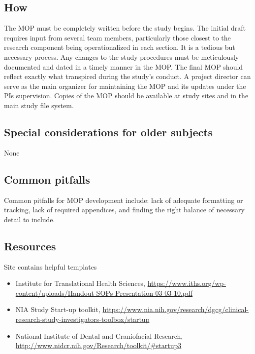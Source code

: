 \documentclass[]{book}
\providecommand{\tightlist}{%
  \setlength{\itemsep}{0pt}\setlength{\parskip}{0pt}}
\theoremstyle{definition}
\theoremstyle{definition}
\theoremstyle{definition}
\theoremstyle{remark}
\begin{document}
\subsection{How}\label{how-12}

The MOP must be completely written before the study begins. The initial
draft requires input from several team members, particularly those
closest to the research component being operationalized in each section.
It is a tedious but necessary process. Any changes to the study
procedures must be meticulously documented and dated in a timely manner
in the MOP. The final MOP should reflect exactly what transpired during
the study's conduct. A project director can serve as the main organizer
for maintaining the MOP and its updates under the PIs supervision.
Copies of the MOP should be available at study sites and in the main
study file system.

\subsection{Special considerations for older
subjects}\label{special-considerations-for-older-subjects-8}

None

\subsection{Common pitfalls}\label{common-pitfalls-11}

Common pitfalls for MOP development include: lack of adequate formatting
or tracking, lack of required appendices, and finding the right balance
of necessary detail to include.

\subsection{Resources}\label{resources-13}

Site contains helpful templates

\begin{itemize}
\tightlist
\item
  Institute for Translational Health Sciences,
  \url{https://www.iths.org/wp-content/uploads/Handout-SOPs-Presentation-03-03-10.pdf}
\item
  NIA Study Start-up toolkit,
  \url{https://www.nia.nih.gov/research/dgcg/clinical-research-study-investigators-toolbox/startup}
\item
  National Institute of Dental and Craniofacial Research,
  \url{http://www.nidcr.nih.gov/Research/toolkit/\#startup3}
\end{itemize}
\end{document}
